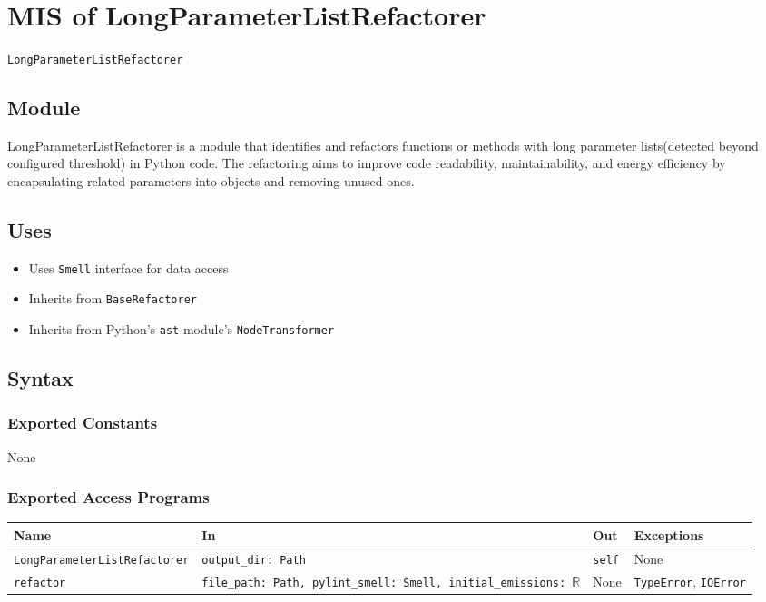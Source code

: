 \documentclass[12pt, titlepage]{article}
\begin{document}
~\newpage

\section{MIS of LongParameterListRefactorer} \label{Module} 

\texttt{LongParameterListRefactorer}

\subsection{Module}

LongParameterListRefactorer is a module that identifies and refactors functions or methods with long parameter lists(detected beyond configured threshold) in Python code. The refactoring aims to improve code readability, maintainability, and energy efficiency by encapsulating related parameters into objects and removing unused ones.

\subsection{Uses}

\begin{itemize}
  \item Uses \texttt{Smell} interface for data access
  \item Inherits from \texttt{BaseRefactorer}
  \item Inherits from Python's \texttt{ast} module's \texttt{NodeTransformer}
\end{itemize}

\subsection{Syntax}

\subsubsection{Exported Constants}

None

\subsubsection{Exported Access Programs}

\begin{center}
\begin{tabularx}{\linewidth}{|l|>{\raggedright\arraybackslash}X|l|l|}
\hline
\textbf{Name} & \textbf{In} & \textbf{Out} & \textbf{Exceptions} \\
\hline
\texttt{LongParameterListRefactorer} & \texttt{output\_dir: Path} & \texttt{self} & None \\
\hline
\texttt{refactor} & \texttt{file\_path: Path, pylint\_smell: Smell, initial\_emissions: $\mathbb{R}$} & None & \texttt{TypeError}, \texttt{IOError} \\
\hline
\end{tabularx}
\end{center}
\end{document}
